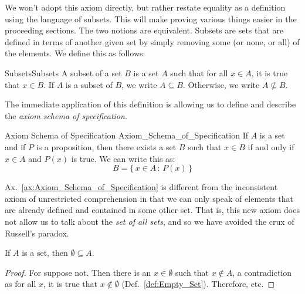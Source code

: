             We won't adopt this axiom directly, but rather restate equality
            as a definition using the language of subsets. This will make
            proving various things easier in the proceeding sections. The
            two notions are equivalent.
            Subsets are sets that are defined in terms of another given set
            by simply removing some (or none, or all) of the elements.
            We define this as follows:
            \begin{fdefinition}{Subsets}{Subsets}
                A subset of a set $B$ is a set $A$ such that for all
                $x\in{A}$, it is true that $x\in{B}$. If $A$ is a subset
                of $B$, we write $A\subseteq{B}$. Otherwise, we write
                $A\nsubseteq{B}$.
            \end{fdefinition}
            The immediate application of this definition is allowing us
            to define and describe the \textit{axiom schema of specification}.
            \begin{faxiom}{Axiom Schema of Specification}
                          {Axiom_Schema_of_Specification}
                If $A$ is a set and if $P$ is a proposition, then there exists
                a set $B$ such that $x\in{B}$ if and only if $x\in{A}$ and
                $P(x)$ is true. We can write this as:
                \begin{equation}
                    B=\{\,x\in{A}\,:\,P(x)\,\}
                \end{equation}
            \end{faxiom}
            Ax.~\ref{ax:Axiom_Schema_of_Specification} is different from the
            inconsistent axiom of unrestricted comprehension in that we can
            only speak of elements that are already defined and contained in
            some other set. That is, this new axiom does not allow us to talk
            about the \textit{set of all sets}, and so we have avoided the
            crux of Russell's paradox.
            \begin{theorem}
                \label{thm:Emptyset_Is_Subset}%
                If $A$ is a set, then $\emptyset\subseteq{A}$.
            \end{theorem}
            \begin{proof}
                For suppose not. Then there is an $x\in\emptyset$ such that
                $x\notin{A}$, a contradiction as for all $x$, it is true that
                $x\notin\emptyset$ (Def.~\ref{def:Empty_Set}). Therefore, etc.
            \end{proof}
